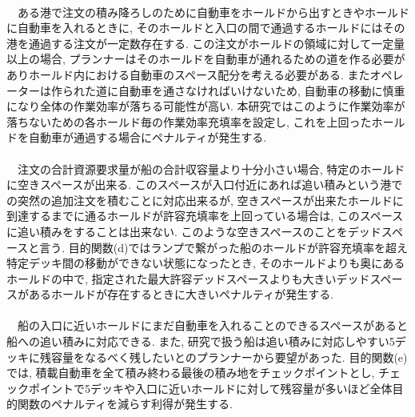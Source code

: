  \\
　ある港で注文の積み降ろしのために自動車をホールドから出すときやホールドに自動車を入れるときに, そのホールドと入口の間で通過するホールドにはその港を通過する注文が一定数存在する. この注文がホールドの領域に対して一定量以上の場合, プランナーはそのホールドを自動車が通れるための道を作る必要がありホールド内における自動車のスペース配分を考える必要がある. またオペレーターは作られた道に自動車を通さなければいけないため, 自動車の移動に慎重になり全体の作業効率が落ちる可能性が高い. 本研究ではこのように作業効率が落ちないための各ホールド毎の作業効率充填率を設定し, これを上回ったホールドを自動車が通過する場合にペナルティが発生する. \\

 \\
　注文の合計資源要求量が船の合計収容量より十分小さい場合, 特定のホールドに空きスペースが出来る. このスペースが入口付近にあれば追い積みという港での突然の追加注文を積むことに対応出来るが, 空きスペースが出来たホールドに到達するまでに通るホールドが許容充填率を上回っている場合は, このスペースに追い積みをすることは出来ない. このような空きスペースのことをデッドスペースと言う. 目的関数(d)ではランプで繋がった船のホールドが許容充填率を超え特定デッキ間の移動ができない状態になったとき, そのホールドよりも奥にあるホールドの中で, 指定された最大許容デッドスペースよりも大きいデッドスペースがあるホールドが存在するときに大きいペナルティが発生する. \\

 \\
　船の入口に近いホールドにまだ自動車を入れることのできるスペースがあると船への追い積みに対応できる. また, 研究で扱う船は追い積みに対応しやすい5デッキに残容量をなるべく残したいとのプランナーから要望があった. 目的関数(e)では, 積載自動車を全て積み終わる最後の積み地をチェックポイントとし, チェックポイントで5デッキや入口に近いホールドに対して残容量が多いほど全体目的関数のペナルティを減らす利得が発生する. \\
\clearpage
